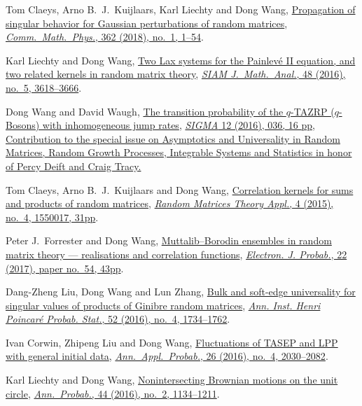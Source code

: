 \documentclass[12pt,a4paper]{article}
\begin{document}
\begin{etaremune}
  Tom Claeys, Arno B.~J.~Kuijlaars, Karl Liechty and Dong Wang, \href{http://arxiv.org/abs/1608.05870}{Propagation of singular behavior for Gaussian perturbations of random matrices}, \href{https://doi.org/10.1007/s00220-018-3195-8}{\textit{Comm.\ Math.\ Phys.}, 362 (2018), no.\ 1, 1--54}.
\item
  Karl Liechty and Dong Wang, \href{http://arxiv.org/abs/1601.01603}{Two Lax systems for the Painlev\'{e} II equation, and two related kernels in random matrix theory}, \href{https://doi.org/10.1137/16M1056080}{\textit{SIAM J.\ Math.\ Anal.}, 48 (2016), no.\ 5, 3618--3666}.
\item
  Dong Wang and David Waugh, \href{http://arxiv.org/abs/1512.01612}{The transition probability of the $q$-TAZRP ($q$-Bosons) with inhomogeneous jump rates}, \href{https://doi.org/10.3842/SIGMA.2016.037}{\textit{SIGMA} 12 (2016), 036, 16 pp, Contribution to the special issue on Asymptotics and Universality in Random Matrices, Random Growth Processes, Integrable Systems and Statistics in honor of Percy Deift and Craig Tracy.}
\item 
  Tom Claeys, Arno B.~J.~Kuijlaars and Dong Wang, \href{http://arxiv.org/abs/1505.00610}{Correlation kernels for sums and products of random matrices}, \href{https://doi.org/10.1142/S2010326315500173}{\textit{Random Matrices Theory Appl.}, 4 (2015), no.\ 4, 1550017, 31pp}.
\item
  Peter J.~Forrester and Dong Wang, \href{http://arxiv.org/abs/1502.07147}{Muttalib--Borodin ensembles in random matrix theory --- realisations and correlation functions}, \href{https://doi.org/10.1214/17-EJP62}{\textit{Electron. J. Probab.}, 22 (2017), paper no.\ 54, 43pp}.
\item
  Dang-Zheng Liu, Dong Wang and Lun Zhang, \href{http://arxiv.org/abs/1412.6777}{Bulk and soft-edge universality for singular values of products of Ginibre random matrices}, \href{https://doi.org/10.1214/15-AIHP696}{\textit{Ann. Inst. Henri Poincar\'e Probab. Stat.}, 52 (2016), no.\ 4, 1734--1762}.
\item
  Ivan Corwin, Zhipeng Liu and Dong Wang, \href{http://arxiv.org/abs/1412.5087}{Fluctuations of TASEP and LPP with general initial data}, \href{https://doi.org/10.1214/15-AAP1139}{\textit{Ann.\ Appl.\ Probab.}, 26 (2016), no.\ 4, 2030--2082}.
\item
  Karl Liechty and Dong Wang, \href{http://arxiv.org/abs/1312.7390}{Nonintersecting Brownian motions on the unit circle}, \href{https://doi.org/10.1214/14-AOP998}{\textit{Ann.\ Probab.}, 44 (2016), no.\ 2, 1134--1211}.

\end{etaremune}
\end{document}
